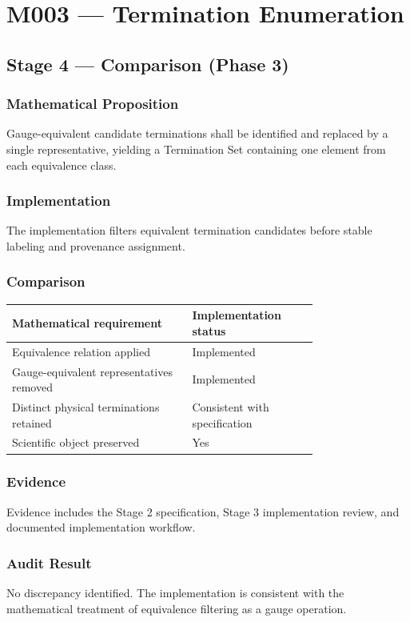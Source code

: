 \chapter{M003 --- Termination Enumeration}

\section{Stage 4 --- Comparison (Phase 3)}

\subsection{Mathematical Proposition}

Gauge-equivalent candidate terminations shall be identified and replaced
by a single representative, yielding a Termination Set containing one
element from each equivalence class.

\subsection{Implementation}

The implementation filters equivalent termination candidates before
stable labeling and provenance assignment.

\subsection{Comparison}

\begin{center}
\begin{tabular}{|p{0.46\linewidth}|p{0.30\linewidth}|}
\hline
Mathematical requirement & Implementation status\\
\hline
Equivalence relation applied & Implemented\\
Gauge-equivalent representatives removed & Implemented\\
Distinct physical terminations retained & Consistent with specification\\
Scientific object preserved & Yes\\
\hline
\end{tabular}
\end{center}

\subsection{Evidence}

Evidence includes the Stage 2 specification, Stage 3 implementation
review, and documented implementation workflow.

\subsection{Audit Result}

No discrepancy identified. The implementation is consistent with the
mathematical treatment of equivalence filtering as a gauge operation.
